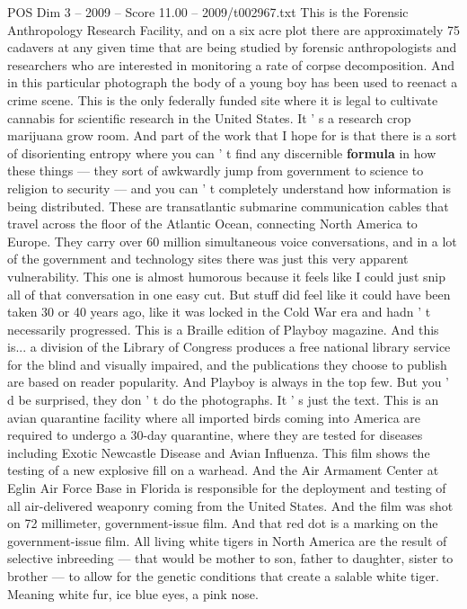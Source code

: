 \begin{textsample}{POS Dim 3 – 2009 – Score 11.00 – 2009/t002967.txt}
This is the Forensic Anthropology Research Facility, and on a six acre plot there are approximately 75 cadavers at any given time that are being studied by forensic anthropologists and researchers who are interested in monitoring a rate of corpse decomposition.
And in this particular photograph the body of a young boy has been used to reenact a crime scene.
This is the only federally funded site where it is legal to cultivate cannabis for scientific research in the United States.
It ' s a research crop marijuana grow room.
And part of the work that I hope for is that there is a sort of disorienting entropy where you can ' t find any discernible \textbf{formula} in how these things — they sort of awkwardly jump from government to science to religion to security — and you can ' t completely understand how information is being distributed.
These are transatlantic submarine communication cables that travel across the floor of the Atlantic Ocean, connecting North America to Europe.
They carry over 60 million simultaneous voice conversations, and in a lot of the government and technology sites there was just this very apparent vulnerability.
This one is almost humorous because it feels like I could just snip all of that conversation in one easy cut.
But stuff did feel like it could have been taken 30 or 40 years ago, like it was locked in the Cold War era and hadn ' t necessarily progressed.
This is a Braille edition of Playboy magazine.
And this is... a division of the Library of Congress produces a free national library service for the blind and visually impaired, and the publications they choose to publish are based on reader popularity.
And Playboy is always in the top few.
But you ' d be surprised, they don ' t do the photographs.
It ' s just the text.
This is an avian quarantine facility where all imported birds coming into America are required to undergo a 30-day quarantine, where they are tested for diseases including Exotic Newcastle Disease and Avian Influenza.
This film shows the testing of a new explosive fill on a warhead.
And the Air Armament Center at Eglin Air Force Base in Florida is responsible for the deployment and testing of all air-delivered weaponry coming from the United States.
And the film was shot on 72 millimeter, government-issue film.
And that red dot is a marking on the government-issue film.
All living white tigers in North America are the result of selective inbreeding — that would be mother to son, father to daughter, sister to brother — to allow for the genetic conditions that create a salable white tiger.
Meaning white fur, ice blue eyes, a pink nose.

\end{textsample}
